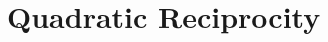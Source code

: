\documentclass[../I&R.tex]{subfiles}
\begin{document}
\chapter{Quadratic Reciprocity}

\subsection*{}
\end{document}
